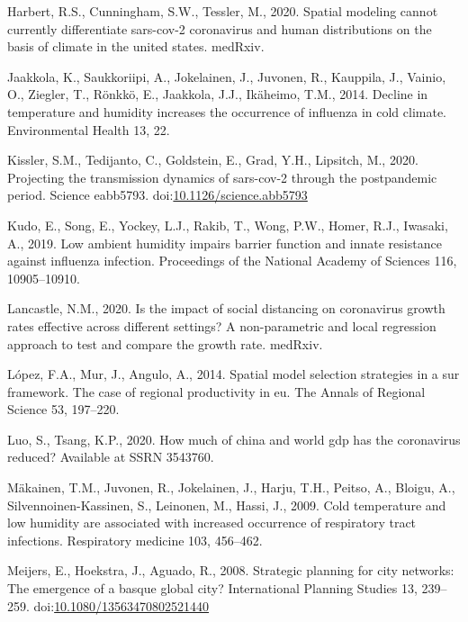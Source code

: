 \documentclass[]{elsarticle} %
\begin{document}
\leavevmode\hypertarget{ref-Harbert2020spatial}{}%
Harbert, R.S., Cunningham, S.W., Tessler, M., 2020. Spatial modeling
cannot currently differentiate sars-cov-2 coronavirus and human
distributions on the basis of climate in the united states. medRxiv.

\leavevmode\hypertarget{ref-Jaakkola2014decline}{}%
Jaakkola, K., Saukkoriipi, A., Jokelainen, J., Juvonen, R., Kauppila,
J., Vainio, O., Ziegler, T., Rönkkö, E., Jaakkola, J.J., Ikäheimo, T.M.,
2014. Decline in temperature and humidity increases the occurrence of
influenza in cold climate. Environmental Health 13, 22.

\leavevmode\hypertarget{ref-Kissler2020projecting}{}%
Kissler, S.M., Tedijanto, C., Goldstein, E., Grad, Y.H., Lipsitch, M.,
2020. Projecting the transmission dynamics of sars-cov-2 through the
postpandemic period. Science eabb5793.
doi:\href{https://doi.org/10.1126/science.abb5793}{10.1126/science.abb5793}

\leavevmode\hypertarget{ref-Kudo2019low}{}%
Kudo, E., Song, E., Yockey, L.J., Rakib, T., Wong, P.W., Homer, R.J.,
Iwasaki, A., 2019. Low ambient humidity impairs barrier function and
innate resistance against influenza infection. Proceedings of the
National Academy of Sciences 116, 10905--10910.

\leavevmode\hypertarget{ref-Lancastle2020impact}{}%
Lancastle, N.M., 2020. Is the impact of social distancing on coronavirus
growth rates effective across different settings? A non-parametric and
local regression approach to test and compare the growth rate. medRxiv.

\leavevmode\hypertarget{ref-Lopez2014spatial}{}%
López, F.A., Mur, J., Angulo, A., 2014. Spatial model selection
strategies in a sur framework. The case of regional productivity in eu.
The Annals of Regional Science 53, 197--220.

\leavevmode\hypertarget{ref-Luo2020how}{}%
Luo, S., Tsang, K.P., 2020. How much of china and world gdp has the
coronavirus reduced? Available at SSRN 3543760.

\leavevmode\hypertarget{ref-Makinen2009cold}{}%
Mäkainen, T.M., Juvonen, R., Jokelainen, J., Harju, T.H., Peitso, A.,
Bloigu, A., Silvennoinen-Kassinen, S., Leinonen, M., Hassi, J., 2009.
Cold temperature and low humidity are associated with increased
occurrence of respiratory tract infections. Respiratory medicine 103,
456--462.

\leavevmode\hypertarget{ref-Meijers2008strategic}{}%
Meijers, E., Hoekstra, J., Aguado, R., 2008. Strategic planning for city
networks: The emergence of a basque global city? International Planning
Studies 13, 239--259.
doi:\href{https://doi.org/10.1080/13563470802521440}{10.1080/13563470802521440}
\end{document}
